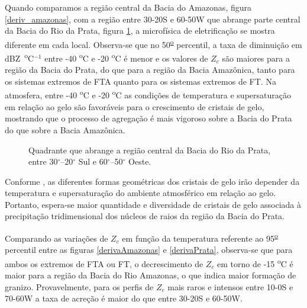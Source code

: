 Quando comparamos a região central da Bacia do Amazonas, figura \ref{deriv_amazonas}, com a região entre 30-20S e 60-50W que abrange parte central da Bacia do Rio da Prata, figura \ref{deriv_prata}, a microfísica de eletrificação se mostra diferente em cada local. Observa-se que no 50\textsuperscript{\underline{o}} percentil, a taxa de diminuição em dBZ~\textsuperscript{o}C$^{-1}$ entre -40 \textsuperscript{o}C e -20 \textsuperscript{o}C é menor e os valores de $Z_c$ são maiores para a região da Bacia do Prata, do que para a região da Bacia Amazônica, tanto para os sistemas extremos de FTA quanto para os sistemas extremos de FT. Na atmosfera, entre -40 \textsuperscript{o}C e -20 \textsuperscript{o}C as condições de temperatura e supersaturação em relação ao gelo são favoráveis para o crescimento de cristais de gelo, mostrando que o processo de agregação é mais vigoroso sobre a Bacia do Prata do que sobre a Bacia Amazônica.%





\begin{figure}[!ht]
\centering
{}
\caption{Quadrante que abrange a região central da Bacia do Rio da Prata, entre 30$^{\circ}$--20$^{\circ}$ Sul e 60$^{\circ}$--50$^{\circ}$ Oeste.}
\label{deriv_prata}
\end{figure}

Conforme , as diferentes formas geométricas dos cristais de gelo irão depender da temperatura e supersaturação do ambiente atmosférico em relação ao gelo. Portanto, espera-se maior quantidade e diversidade de cristais de gelo associada à precipitação tridimensional dos núcleos de raios  da região da Bacia do Prata.

Comparando as variações de $Z_c$ em função da temperatura referente ao 95\textsuperscript{\underline{o}} percentil entre as figuras \ref{derivaAmazonas} e \ref{derivaPrata}, observa-se que para ambos os extremos de FTA ou FT, o decrescimento de $Z_c$ em torno de -15 \textsuperscript{o}C é maior para a região da Bacia do Rio Amazonas, o que indica maior formação de granizo. Provavelmente, para os perfis de $Z_c$ mais raros e intensos entre 10-0S e 70-60W a taxa de acreção é maior do que entre 30-20S e 60-50W. 

